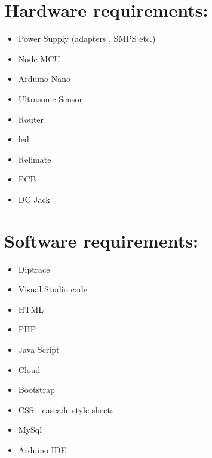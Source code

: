 \documentclass[]{article}
\begin{document}
\section[]{Hardware requirements:}
\begin{itemize}
	\item Power Supply (adapters , SMPS etc.)
	\item Node MCU
	\item Arduino Nano
	\item Ultrasonic Sensor
	\item Router
	\item led
	\item Relimate
	\item PCB
	\item DC Jack
\end{itemize}

\section{Software requirements:}
\begin{itemize}
\item Diptrace
\item Visual Studio code
\item HTML
\item PHP
\item Java Script
\item Cloud
\item Bootstrap
\item CSS - cascade style sheets
\item MySql
\item Arduino IDE
\end{itemize}
\end{document}
